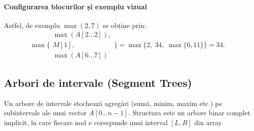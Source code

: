 \documentclass[11pt,a4paper]{article}
\theoremstyle{definition}
\theoremstyle{plain}
\theoremstyle{remark}
\begin{document}
\paragraph{Configurarea blocurilor și exemplu vizual}

\begin{center}
\end{center}
\noindent Astfel, de exemplu \(\max(2,7)\) se obține prin:
\[
\max\Biggl\{
\begin{array}{c}
\max(A[2\ldots2]),\\[4ex]
M[1],\\[4ex]
\max(A[6\ldots7])
\end{array}
\Biggr\}
=\max\{2,\;34,\;\max\{6,11\}\}=34.
\]

\subsection*{Arbori de intervale (Segment Trees)}

Un arbore de intervale stochează agregări (sumă, minim, maxim etc.) pe subintervale ale unui vector \(A[0\ldots n-1]\). Structura este un arbore binar complet implicit, în care fiecare nod \(\nu\) corespunde unui interval \([L,R]\) din array.
\end{document}
